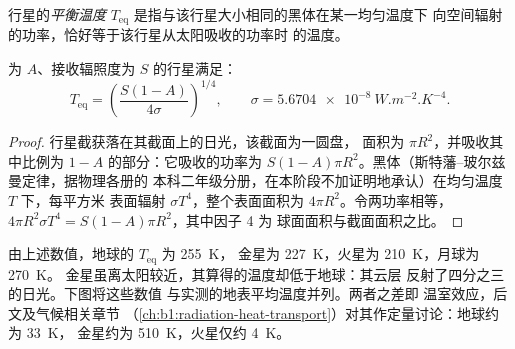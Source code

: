\begin{definition}[平衡温度]\label{def:b1:comparative-planetology:equilibrium-temperature}
行星的\emph{平衡温度} $T_\mathrm{eq}$
是指与该行星大小相同的黑体在某一均匀温度下
向空间辐射的功率，恰好等于该行星从太阳吸收的功率时
的温度。
\end{definition}

\begin{proposition}[平衡温度]\label{prop:b1:comparative-planetology:teq}
为 $A$、接收辐照度为 $S$ 的行星满足：
\[
  T_\mathrm{eq} = \left(\frac{S(1 - A)}{4\sigma}\right)^{1/4},
  \qquad \sigma = \qty{5.6704e-8}{W.m^{-2}.K^{-4}} .
\]
\end{proposition}

\begin{proof}
行星截获落在其截面上的日光，该截面为一圆盘，
面积为 $\pi R^2$，并吸收其中比例为 $1 - A$ 的部分：它吸收的功率为 $S(1 - A)\pi
R^2$。黑体（斯特藩–玻尔兹曼定律，据物理各册的
本科二年级分册，在本阶段不加证明地承认）在均匀温度 $T$ 下，每平方米
表面辐射 $\sigma T^4$，整个表面面积为 $4\pi R^2$。令两功率相等，
$4\pi R^2\sigma T^4 = S(1 - A)\pi R^2$，其中因子 4 为
球面面积与截面面积之比。
\end{proof}

由上述数值，地球的 $T_\mathrm{eq}$ 为 \qty{255}{K}，
金星为 \qty{227}{K}，火星为 \qty{210}{K}，月球为 \qty{270}{K}。
金星虽离太阳较近，其算得的温度却低于地球：其云层
反射了四分之三的日光。下图将这些数值
与实测的地表平均温度并列。两者之差即
温室效应，后文及气候相关章节
（\cref{ch:b1:radiation-heat-transport}）对其作定量讨论：地球约为 \qty{33}{K}，
金星约为 \qty{510}{K}，火星仅约 \qty{4}{K}。

